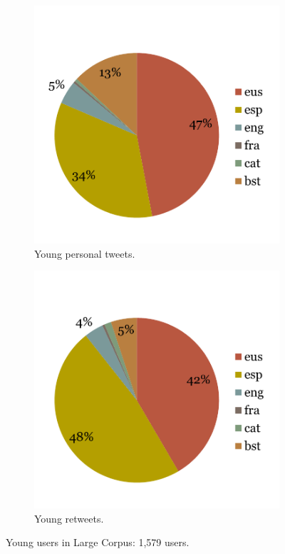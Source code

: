 \documentclass[information,article,submit,moreauthors,pdftex,10pt,a4paper]{Definitions/mdpi}
\begin{document}
\begin{figure}[H]
  \centering
  \begin{subfigure}[b]{0.48\linewidth}
    \includegraphics[width=\linewidth]{txio_gazte}
    \caption{Young personal tweets.}
  \end{subfigure}
  \begin{subfigure}[b]{0.48\linewidth}
    \includegraphics[width=\linewidth]{birtxio_gazte}
    \caption{Young retweets.}
  \end{subfigure}
  \caption{Young users in Large Corpus: 1,579 users.}
  \label{fig:gazte txbtx}
\end{figure}
\end{document}
